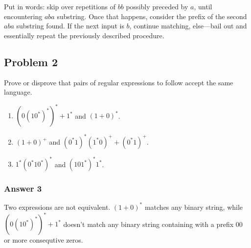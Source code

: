 \documentclass[11pt]{article}
\begin{document}

Put in words: skip over repetitions of \(bb\) possibly preceded by \(a\), until
encountering \(aba\) substring.  Once that happens, consider the prefix of the
second \(aba\) substring found.  If the next input is \(b\), continue matching,
else---bail out and essentially repeat the previously described procedure.

\subsection{Problem 2}
\label{sec:orgheadline8}
Prove or disprove that pairs of regular expressions to follow accept the same
language.
\begin{enumerate}
\item \((0(10^*)^*)^*+1^*\) and \((1+0)^*\).
\item \((1+0)^+\) and \((0^*1)^*(1^*0)^++(0^*1)^+\).
\item \(1^*(0^*10^*)^*\) and \((101^*)^*1^*\).
\end{enumerate}

\subsubsection{Answer 3}
\label{sec:orgheadline5}
Two expressions are not equivalent.  \((1+0)^*\) matches any binary string,
while \((0(10^*)^*)^*+1^*\) doesn't match any binary string containing with a
prefix 00 or more consequtive zeros.
\end{document}
